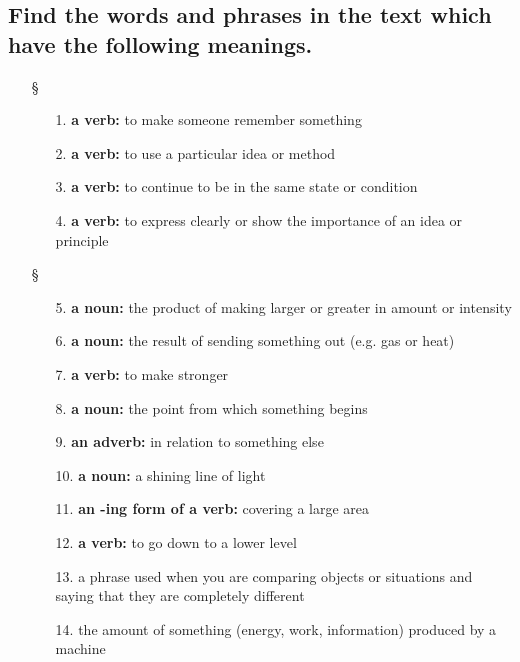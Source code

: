 \subsection*{Find the words and phrases in the text which have the following meanings.}
\begin{enumerate}
      \item[§] 
            \begin{enumerate}
                  \item[1.] \textbf{a verb:} to make someone remember something
                  \item[2.] \textbf{a verb:} to use a particular idea or method
                  \item[3.] \textbf{a verb:} to continue to be in the same state or condition
                  \item[4.] \textbf{a verb:} to express clearly or show the importance of an
                        idea or principle
            \end{enumerate}
      \item[§] 
            \begin{enumerate}
                  \item[5.] \textbf{a noun:} the product of making larger or greater in amount
                        or intensity
                  \item[6.] \textbf{a noun:} the result of sending something out (e.g. gas or
                        heat)
                  \item[7.] \textbf{a verb:} to make stronger
                  \item[8.] \textbf{a noun:} the point from which something begins
                  \item[9.] \textbf{an adverb:} in relation to something else
                  \item[10.] \textbf{a noun:} a shining line of light
                  \item[11.] \textbf{an -ing form of a verb:} covering a large area
                  \item[12.] \textbf{a verb:} to go down to a lower level
                  \item[13.] a phrase used when you are comparing objects or situations
                        and saying that they are completely different
                  \item[14.] the amount of something (energy, work, information)
                        produced by a machine
            \end{enumerate}

\end{enumerate}
